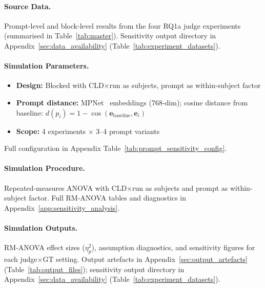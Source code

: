\paragraph{Source Data.}
Prompt-level and block-level results from the four RQ1a judge experiments (summarised in Table~\ref{tab:master}).
Sensitivity output directory in Appendix~\ref{sec:data_availability} (Table~\ref{tab:experiment_datasets}).

\paragraph{Simulation Parameters.}
\begin{itemize}[noitemsep]
    \item \textbf{Design:} Blocked with CLD$\times$run as subjects, prompt as within-subject factor
    \item \textbf{Prompt distance:} MPNet~\cite{song2020mpnet} embeddings (768-dim); cosine distance from baseline: $d(p_i) = 1 - \cos(\mathbf{e}_{\text{baseline}}, \mathbf{e}_i)$
    \item \textbf{Scope:} 4 experiments $\times$ 3--4 prompt variants
\end{itemize}
Full configuration in Appendix Table~\ref{tab:prompt_sensitivity_config}.

\paragraph{Simulation Procedure.}
Repeated-measures ANOVA with CLD$\times$run as subjects and prompt as within-subject factor.
Full RM-ANOVA tables and diagnostics in Appendix~\ref{app:sensitivity_analysis}.

\paragraph{Simulation Outputs.}
RM-ANOVA effect sizes ($\eta^2_p$), assumption diagnostics, and sensitivity figures for each judge$\times$GT setting.
Output artefacts in Appendix~\ref{sec:output_artefacts} (Table~\ref{tab:output_files}); sensitivity output directory in Appendix~\ref{sec:data_availability} (Table~\ref{tab:experiment_datasets}).

